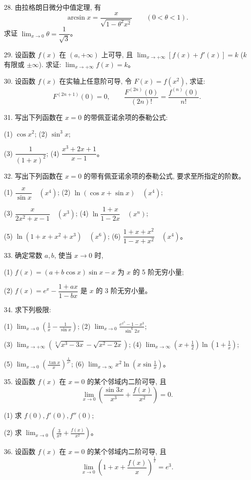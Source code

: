 \documentclass[UTF8,12pt,a4paper,fontset=fandol]{ctexart}
\begin{document}
28. 由拉格朗日微分中值定理, 有
\[
  \arcsin x=\frac{x}{\sqrt{1-\theta^2x^2}}\qquad (0<\theta<1).
\]
求证 $\lim_{x\to0}\theta=\dfrac1{\sqrt3}$。

29. 设函数 $f(x)$ 在 $(a,+\infty)$ 上可导, 且 $\lim_{x\to+\infty}[f(x)+f'(x)]=k$ ($k$ 有限或 $\pm\infty$). 求证: $\lim_{x\to+\infty}f(x)=k$。

30. 设函数 $f(x)$ 在实轴上任意阶可导, 令 $F(x)=f(x^2)$, 求证:
\[
  F^{(2n+1)}(0)=0,\qquad
  \frac{F^{(2n)}(0)}{(2n)!}=\frac{f^{(n)}(0)}{n!}.
\]

31. 写出下列函数在 $x=0$ 的带佩亚诺余项的泰勒公式:

(1) $\cos x^2$;\qquad
(2) $\sin^3x$;

(3) $\dfrac1{(1+x)^2}$;\qquad
(4) $\dfrac{x^3+2x+1}{x-1}$。

32. 写出下列函数在 $x=0$ 的带有佩亚诺余项的泰勒公式, 要求至所指定的阶数。

(1) $\dfrac{x}{\sin x}\quad (x^4)$;\qquad
(2) $\ln(\cos x+\sin x)\quad (x^4)$;

(3) $\dfrac{x}{2x^2+x-1}\quad (x^3)$;\qquad
(4) $\ln\dfrac{1+x}{1-2x}\quad (x^n)$;

(5) $\ln(1+x+x^2+x^3)\quad (x^6)$;\qquad
(6) $\dfrac{1+x+x^2}{1-x+x^2}\quad (x^4)$。

33. 确定常数 $a,b$, 使当 $x\to0$ 时,

(1) $f(x)=(a+b\cos x)\sin x-x$ 为 $x$ 的 5 阶无穷小量;

(2) $f(x)=e^x-\dfrac{1+ax}{1-bx}$ 是 $x$ 的 3 阶无穷小量。

34. 求下列极限:

(1) $\displaystyle\lim_{x\to0}\left(\frac1x-\frac1{\sin x}\right)$;\qquad
(2) $\displaystyle\lim_{x\to0}\frac{e^{x^3}-1-x^3}{\sin^6 2x}$;

(3) $\displaystyle\lim_{x\to+\infty}\left(\sqrt[3]{x^3-3x}-\sqrt{x^2-2x}\right)$;\qquad
(4) $\displaystyle\lim_{x\to\infty}\left(x+\frac12\right)\ln\left(1+\frac1x\right)$;

(5) $\displaystyle\lim_{x\to0}\left(\frac{\tan x}{x}\right)^{\frac1{x^2}}$;\qquad
(6) $\displaystyle\lim_{x\to\infty}x^2\ln\left(x\sin\frac1x\right)$。

35. 设函数 $f(x)$ 在 $x=0$ 的某个邻域内二阶可导, 且
\[
  \lim_{x\to0}\left(\frac{\sin3x}{x^3}+\frac{f(x)}{x^2}\right)=0.
\]

(1) 求 $f(0),f'(0),f''(0)$;

(2) 求 $\displaystyle\lim_{x\to0}\left(\frac3{x^2}+\frac{f(x)}{x^2}\right)$。

36. 设函数 $f(x)$ 在 $x=0$ 的某个邻域内二阶可导, 且
\[
  \lim_{x\to0}\left(1+x+\frac{f(x)}x\right)^{\frac1x}=e^3.
\]
\end{document}
